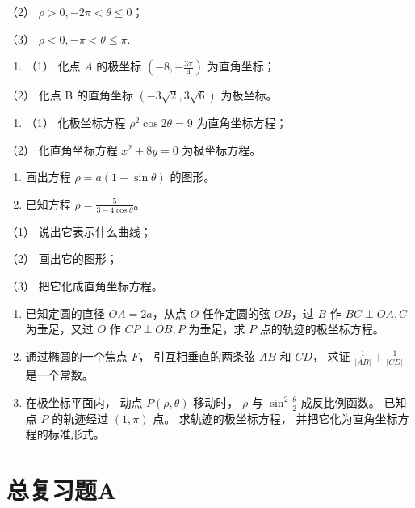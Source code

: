 （2） \(\rho > 0, -2\pi < \theta \leqslant 0\)；

（3） \(\rho < 0, -\pi < \theta \leqslant \pi.\)

\begin{enumerate}
\def\labelenumi{\arabic{enumi}.}
\setcounter{enumi}{1}
\tightlist
\item
  （1） 化点 \(A\) 的极坐标 \(\left(-8, -\frac{3\pi}{4}\right)\)
  为直角坐标；
\end{enumerate}

（2） 化点 B 的直角坐标 \((-3\sqrt{2}, 3\sqrt{6})\) 为极坐标。

\begin{enumerate}
\def\labelenumi{\arabic{enumi}.}
\setcounter{enumi}{2}
\tightlist
\item
  （1） 化极坐标方程 \(\rho^2\cos 2\theta = 9\) 为直角坐标方程；
\end{enumerate}

（2） 化直角坐标方程 \(x^{2}+8y=0\) 为极坐标方程。

\begin{enumerate}
\def\labelenumi{\arabic{enumi}.}
\setcounter{enumi}{3}
\item
  画出方程 \(\rho = a(1 - \sin \theta)\) 的图形。
\item
  已知方程 \(\rho = \frac{5}{3 - 4\cos\theta}\)。
\end{enumerate}

（1） 说出它表示什么曲线；

（2） 画出它的图形；

（3） 把它化成直角坐标方程。

\begin{enumerate}
\def\labelenumi{\arabic{enumi}.}
\setcounter{enumi}{5}
\item
  已知定圆的直径 \(OA = 2a\)，从点 \(O\) 任作定圆的弦 \(OB\)，过 \(B\)
  作 \(BC \perp OA, C\) 为垂足，又过 \(O\) 作 \(CP \perp OB, P\)
  为垂足，求 \(P\) 点的轨迹的极坐标方程。
\item
  通过椭圆的一个焦点 \(F\)， 引互相垂直的两条弦 \(AB\) 和 \(CD\)， 求证
  \(\frac{1}{|AB|} + \frac{1}{|CD|}\) 是一个常数。
\item
  在极坐标平面内， 动点 \(P(\rho, \theta)\) 移动时， \(\rho\) 与
  \(\sin^2 \frac{\theta}{2}\) 成反比例函数。 已知点 \(P\) 的轨迹经过
  \((1, \pi)\) 点。 求轨迹的极坐标方程，
  并把它化为直角坐标方程的标准形式。
\end{enumerate}

\section{总复习题A}\label{ux603bux590dux4e60ux9898a}

